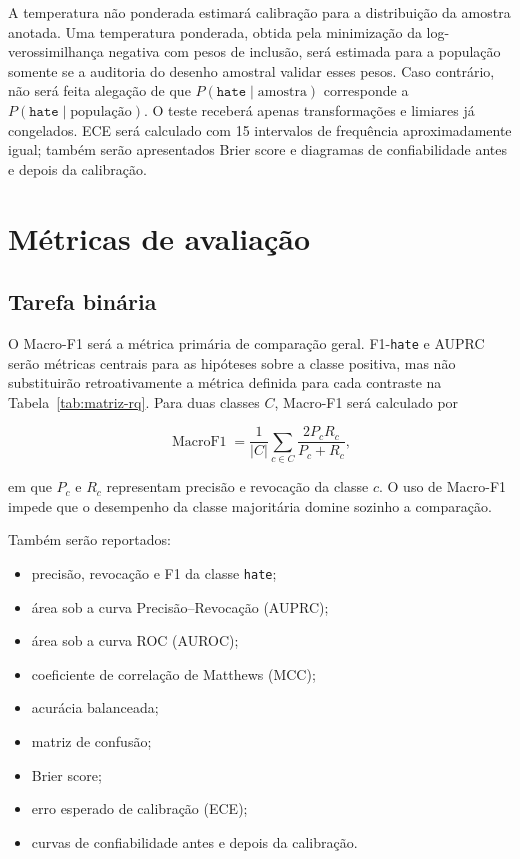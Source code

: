 A temperatura não ponderada estimará calibração para a distribuição da amostra
anotada. Uma temperatura ponderada, obtida pela minimização da log-verossimilhança
negativa com pesos de inclusão, será estimada para a população somente se a
auditoria do desenho amostral validar esses pesos. Caso contrário, não será feita
alegação de que $P(\texttt{hate}\mid\text{amostra})$ corresponde a
$P(\texttt{hate}\mid\text{população})$. O teste receberá apenas transformações e
limiares já congelados. ECE será calculado com 15 intervalos de frequência
aproximadamente igual; também serão apresentados Brier score e diagramas de
confiabilidade antes e depois da calibração.

\section{Métricas de avaliação}
\label{sec:metricas-avaliacao}

\subsection{Tarefa binária}

O Macro-F1 será a métrica primária de comparação geral. F1-\texttt{hate} e AUPRC
serão métricas centrais para as hipóteses sobre a classe positiva, mas não
substituirão retroativamente a métrica definida para cada contraste na
Tabela~\ref{tab:matriz-rq}. Para duas classes $C$, Macro-F1 será calculado
por

\begin{equation}
    \operatorname{MacroF1} = \frac{1}{|C|}\sum_{c\in C}
    \frac{2P_cR_c}{P_c+R_c},
\end{equation}

em que $P_c$ e $R_c$ representam precisão e revocação da classe $c$. O uso de
Macro-F1 impede que o desempenho da classe majoritária domine sozinho a
comparação.

Também serão reportados:

\begin{itemize}
    \item precisão, revocação e F1 da classe \texttt{hate};
    \item área sob a curva Precisão--Revocação (AUPRC);
    \item área sob a curva ROC (AUROC);
    \item coeficiente de correlação de Matthews (MCC);
    \item acurácia balanceada;
    \item matriz de confusão;
    \item Brier score;
    \item erro esperado de calibração (ECE);
    \item curvas de confiabilidade antes e depois da calibração.
\end{itemize}

